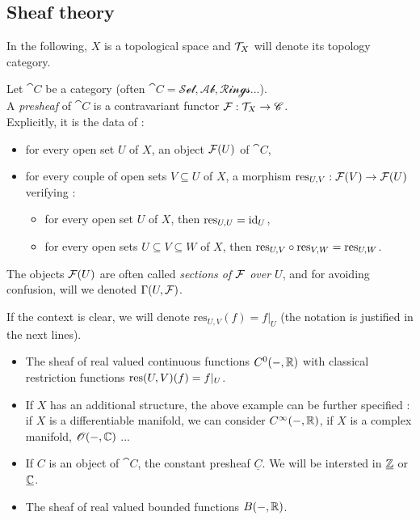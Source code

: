 \subsection{Sheaf theory}



In the following, $X$ is a topological space and $\mathcal{T}_X$ will denote its topology category. 

\begin{mydef}

Let $\cat{C}$ be a category (often $\cat{C} = \mathscr{Set}, \mathscr{Ab}, \mathscr{Rings}$...).\\
A \textit{presheaf} of $\cat{C}$ is a contravariant functor $\mathcal{F} : \mathcal{T}_X \to \mathscr{C}$.\\
Explicitly, it is the data of :
\begin{itemize}
\item[1.] for every open set $U$ of $X$, an object $\mathcal{F}(U)$ of $\cat{C}$,
\item[2.] for every couple of open sets $V \subseteq U$ of $X$, a morphism $\text{res}_{U,V} : \mathcal{F}(V) \to \mathcal{F}(U)$ verifying :
\begin{itemize}
\item[a.] for every open set $U$ of $X$, then $\text{res}_{U,U} = \text{id}_U$,
\item[b.] for every open sets $U\subseteq V \subseteq W$ of $X$, then $\text{res}_{U,V} \circ \text{res}_{V,W} = \text{res}_{U,W}$.
\end{itemize}
\end{itemize}
The objects $\mathcal{F}(U)$ are often called \textit{sections of $\mathcal{F}$ over $U$}, and for avoiding confusion, will we denoted $\Gamma(U,\mathcal{F})$.
\end{mydef}

\begin{myrem}
If the context is clear, we will denote $\text{res}_{U,V}(f) = f|_U$ (the notation is justified in the next lines).
\end{myrem}

\begin{myex}
\begin{itemize}
\item[1)] The sheaf of real valued continuous functions $C^0(\--,\mathbb{R})$ with classical restriction functions $\text{res}(U,V)(f) = f|_U$.
\item[2)] If $X$ has an additional structure, the above example can be further specified : if $X$ is a differentiable manifold, we can consider $C^\infty(\--,\mathbb{R})$, if $X$ is a complex manifold, $\mathscr{O}(\--,\mathbb{C})$ ...
\item[3)] If $C$ is an object of $\cat{C}$, the constant presheaf $\underline{C}$. We will be intersted in $\underline{\mathbb{Z}}$ or $\underline{\mathbb{C}}$.
\item[4)] The sheaf of real valued bounded functions $B(\--,\mathbb{R})$.
\end{itemize}
\end{myex}

